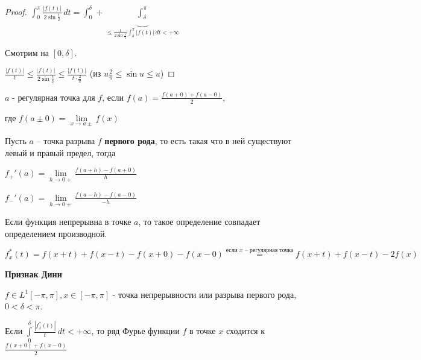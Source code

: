 \begin{proof}
    $\int_0^\pi \frac{|f(t)|}{2\sin \frac{t}{2}} \, dt = \int_0^\delta + \underbrace{\int_\delta^\pi}_{\leqslant \frac{1}{2\sin \frac{\delta}{2}} \int_\delta^\pi |f(t)| \, dt < +\infty } $

    Смотрим на $[0, \delta]$.

    $\frac{|f(t)|}{t} \leqslant \frac{|f(t)|}{2 \sin \frac{t}{2}} \leqslant \frac{|f(t)|}{t \cdot \frac{2}{\pi}}$ (из $u \frac{2}{\pi} \leqslant \sin u \leqslant u$)
\end{proof}


\begin{definition}
    $a$ - регулярная точка для $f$, если $f(a) = \frac{f(a + 0) + f(a - 0)}{2}$,

    где $f(a \pm 0) = \lim\limits_{x \to a\pm} f(x)$
\end{definition}

\begin{definition}
    Пусть $a$ -- точка разрыва $f$ \textbf{первого рода}, то есть такая что в ней существуют левый и правый предел, тогда

    $f_+' (a) = \lim\limits_{h \to 0+} \frac{f(a + h) - f(a + 0)}{h}$

    $f_-' (a) = \lim\limits_{h \to 0+} \frac{f(a - h) - f(a - 0)}{-h}$

    Если функция непрерывна в точке $a$, то такое определение совпадает определением производной.
\end{definition}


\begin{definition}
    $f_x^* (t) = f(x + t) + f(x - t) - f(x + 0) - f(x - 0) \overset{\text{если $x$ -- регулярная точка}}{=} f(x + t) + f(x - t) - 2f(x)$
\end{definition}

\begin{theorem}
    \textbf{Признак Дини}

    $f \in L^{1} [-\pi, \pi], x \in [-\pi, \pi]$ - точка непрерывности или разрыва первого рода, $0 < \delta < \pi$.

    Если $\int\limits_0^\delta \frac{|f_x^* (t)|}{t} \, dt < +\infty$, то ряд Фурье
    функции $f$ в точке $x$ сходится к $\frac{f(x + 0) + f(x - 0)}{2}$
\end{theorem}

